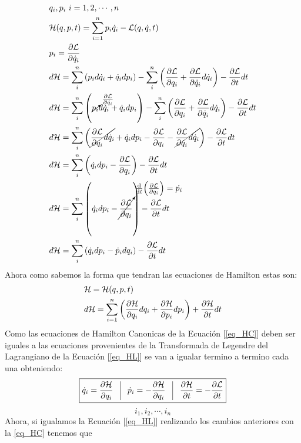 \documentclass[12pt]{article}
\newcommand{\en}[1]{\[\boxed{#1}\]}
\newcommand{\mc}[1]{\mathcal{#1}}
\newcommand{\sumn}[1]{\sum_{#1 =1}^{n}}
\newcommand{\xn}[1]{{#1}_{1},{#1}_{2},\cdots,{#1}_{n}}
\newcommand{\eqreff}[1]{Ecuación [\ref{#1}]}
\newcommand{\rojo}[1]{{\color{rojo}#1}}
\begin{document}
\begin{align}
&q_i,p_i \,\, i=1,2,\cdots,n\\
&\mathcal{H}(q,p,t)= \sum_{i=1}^{n} p_i \dot{q}_i - \mathcal{L}(q,\dot{q},t)\\
&p_i=\pdv{\mathcal{L} }{\dot{q}_i}	\\
&d\mathcal{H} = \sum_{i}^{n} \qty(p_i d\dot{q}_i + \dot{q}_i dp_i) - \sum_{i}^{n} \qty(\pdv{\mathcal{L}}{q_i}+ \pdv{\mathcal{L}}{\dot{q}_i} d\dot{q}_i) - \pdv{\mathcal{L}}{t} dt\\
&d\mathcal{H} = \sum_{i}^{n} \qty(\cancelto{\pdv{\mathcal{L} }{\dot{q}_i}}{p_i} d\dot{q}_i + \dot{q}_i dp_i) - \sum_{i}^{n} \qty(\pdv{\mathcal{L}}{q_i}+ \pdv{\mathcal{L}}{\dot{q}_i} d\dot{q}_i) - \pdv{\mathcal{L}}{t} dt\\
&d\mathcal{H} = \sum_{i}^{n} \qty(\cancel{{\pdv{\mathcal{L} }{\dot{q}_i}}d\dot{q}_i} + \dot{q}_i dp_i -\pdv{\mathcal{L}}{q_i}- \cancel{\pdv{\mathcal{L} }{\dot{q}_i}d\dot{q}_i}) - \pdv{\mathcal{L}}{t} dt\\
&d\mathcal{H} = \sum_{i}^{n} \qty(\dot{q}_i dp_i -\pdv{\mathcal{L}}{q_i}) - \pdv{\mathcal{L}}{t} dt\\
&d\mathcal{H} = \sum_{i}^{n} \qty(\dot{q}_i dp_i -\cancelto{\dv{}{t}\qty(\pdv{\mathcal{L}}{q_i}) =\dot{p_i}}{\pdv{\mathcal{L}}{q_i}}) - \pdv{\mathcal{L}}{t} dt\\
&d\mathcal{H} = \sum_{i}^{n} \qty(\dot{q}_i dp_i -\dot{p}_i dq_i) - \pdv{\mathcal{L}}{t} dt\label{eq_HL}
\end{align}
Ahora como sabemos la forma que tendran las ecuaciones de Hamilton estas son:
\begin{align}
	&\mathcal{H}= \mathcal{H}(q,p,t)\\
	& d\mathcal{H}= \sumn{i} \qty(\pdv{\mc{H}}{q_i}dq_i + \pdv{\mc{H}}{p_i}dp_i)+ \pdv{\mc{H}}{t}dt \label{eq_HC}
\end{align}
Como las ecuaciones de Hamilton Canonicas de la \eqreff{eq_HC} deben ser iguales a las ecuaciones provenientes de la Transformada de Legendre del Lagrangiano de la \eqreff{eq_HL} se van a igualar termino a termino cada una obteniendo:
\rojo{\en{\dot{q}_i = \pdv{\mc{H}}{q_i} \hspace{3mm}\vline \hspace{3mm} \dot{p}_i =-\pdv{\mc{H}}{q_i} \hspace{3mm}\vline \hspace{3mm} \pdv{\mc{H}}{t}= - \pdv{\mc{L}}{t}}}
$$\xn{i}$$
Ahora, si igualamos la \eqreff{eq_HL} realizando los cambios anteriores con la \eqref{eq_HC} tenemos que
\end{document}
